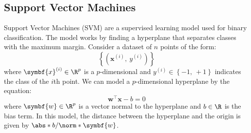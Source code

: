 \documentclass{article}
\begin{document}
\subsection{Support Vector Machines}
Support Vector Machines (SVM) are a supervised learning model used for
binary classification. The model works by finding a hyperplane that
separates classes with the maximum margin. Consider a dataset of \(n\)
points of the form:
\begin{equation*}
    \left\{ \left( \symbf{x}^{\left( i \right)},\: y^{\left( i \right)} \right) \right\}
\end{equation*}
where \(\symbf{x}^{\left( i \right)} \in \R^p\) is a \(p\)-dimensional
and \(y^{\left( i \right)} \in \left\{ -1,\: {+}1 \right\}\) indicates the
class of the \(i\)th point. We can model a \(p\)-dimensional
hyperplane by the equation:
\begin{equation*}
    \symbf{w}^\top \symbf{x} - b = 0
\end{equation*}
where \(\symbf{w} \in \R^p\) is a vector normal to the hyperplane and
\(b \in \R\) is the bias term. In this model, the distance between the
hyperplane and the origin is given by \(\abs*{b} / \norm*{\symbf{w}}\).
\end{document}

